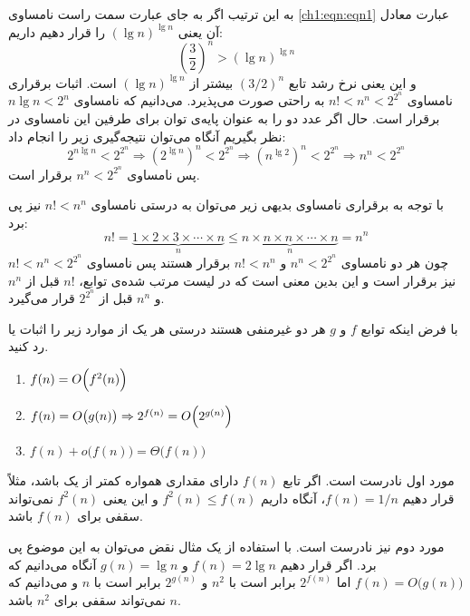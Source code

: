 به این ترتیب اگر به جای عبارت سمت راست نامساوی {\eqref{ch1:eqn:eqn1}} عبارت معادل آن یعنی {${(\lg n)}^{\lg n}$} را قرار دهیم داریم:
\begin{displaymath}
{\left( \frac{3}{2}\right)}^n > {(\lg n)}^{\lg n}
\end{displaymath}
و این یعنی نرخ رشد تابع {${(3/2)}^n$} بیشتر از {${(\lg n)}^{\lg n}$} است.
 اثبات برقراری نامساوی {$n! < n^n < 2^{2^n}$} به راحتی صورت می‌پذیرد. می‌دانیم که نامساوی {$n\lg n < 2^n$} برقرار است. حال اگر عدد دو را به عنوان پایه‌ی توان برای طرفین این نامساوی در نظر بگیریم آنگاه می‌توان نتیجه‌گیری زیر را انجام داد:
\begin{equation*}
2^{n\lg n} < 2^{2^n} \Rightarrow {(2^{\lg n})}^n < 2^{2^n} \Rightarrow {(n^{\lg 2})}^n < 2^{2^n} \Rightarrow n^n < 2^{2^n}
\end{equation*}
پس نامساوی {$n^n < 2^{2^n}$} برقرار است.

با توجه به برقراری نامساوی بدیهی زیر می‌توان به درستی نامساوی {$n! < n^n$} نیز پی برد:
\begin{displaymath}
n! = \underbrace{1 \times 2 \times 3 \times \cdots \times n}_{n} \leq \underbrace{ n \times n \times n \times \cdots \times n}_{n}=n^n
\end{displaymath}
چون هر دو نامساوی {$n^n < 2^{2^n}$} و {$n! < n^n$} برقرار هستند پس نامساوی {$n! < n^n < 2^{2^n}$} نیز برقرار است و  این بدین معنی است که در لیست مرتب ‌شده‌ی توابع، {$n!$} قبل از {$n^n$} و {$n^n$} قبل از {$2^{2^n}$} قرار می‌گیرد.

 با فرض اینکه توابع {$f$} و {$g$} هر دو غیرمنفی هستند درستی هر یک از موارد زیر را اثبات یا رد کنید.
\begin{enumerate}
\item $f(n)=O\Bigl( f^2(n) \Bigr)$
\item $f(n)=O\bigl( g(n) \bigr) \Rightarrow 2^{f(n)}=O\Bigl( 2^{g(n)} \Bigr)$
\item $f(n)+o\bigl( f(n) \bigr) = \Theta \bigl( f(n)\bigr)$
\end{enumerate}

مورد اول نادرست است. اگر تابع {$f(n)$} دارای مقداری همواره کمتر از یک باشد، مثلاً قرار دهیم {$f(n)=1/n$}، آنگاه داریم {$f^2(n) \leqslant f(n)$} و این یعنی {$f^2(n)$} نمی‌تواند سقفی برای {$f(n)$} باشد.

مورد دوم نیز نادرست است. با استفاده از یک مثال نقض می‌توان به این موضوع پی ‌برد. اگر قرار دهیم {$f(n)=2\lg n$} و {$g(n)=\lg n$} آنگاه می‌دانیم که {$f(n)=O\bigl( g(n) \bigr)$} اما {$2^{f(n)}$} برابر است با {$n^2$} و {$2^{g(n)}$} برابر است با {$n$} و می‌دانیم که {$n$} نمی‌تواند سقفی برای {$n^2$} باشد.

